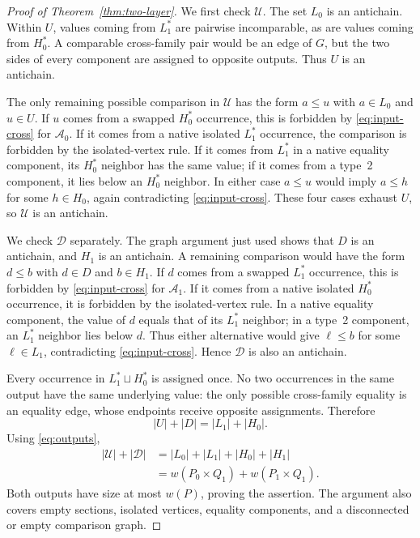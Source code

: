 \documentclass[11pt]{article}
\newcommand{\Q}{Q}
\newcommand{\cA}{\mathcal A}
\newcommand{\cD}{\mathcal D}
\newcommand{\cU}{\mathcal U}
\begin{document}
\begin{proof}[Proof of Theorem~\ref{thm:two-layer}]
We first check $\cU$.  The set $L_0$ is an antichain.  Within $U$, values
coming from $L_1^*$ are pairwise incomparable, as are values coming from
$H_0^*$.  A comparable cross-family pair would be an edge of $G$, but the
two sides of every component are assigned to opposite outputs.  Thus $U$ is
an antichain.

The only remaining possible comparison in $\cU$ has the form $a\leq u$
with $a\in L_0$ and $u\in U$.  If $u$ comes from a swapped $H_0^*$
occurrence, this is forbidden by \eqref{eq:input-cross} for $\cA_0$.  If it
comes from a native isolated $L_1^*$ occurrence, the comparison is forbidden
by the isolated-vertex rule.  If it comes from $L_1^*$ in a native equality
component, its $H_0^*$ neighbor has the same value; if it comes from a
type~2 component, it lies below an $H_0^*$ neighbor.  In either case
$a\leq u$ would imply $a\leq h$ for some $h\in H_0$, again contradicting
\eqref{eq:input-cross}.  These four cases exhaust $U$, so $\cU$ is an
antichain.

We check $\cD$ separately.  The graph argument just used shows that $D$ is
an antichain, and $H_1$ is an antichain.  A remaining comparison would have
the form $d\leq b$ with $d\in D$ and $b\in H_1$.  If $d$ comes from a
swapped $L_1^*$ occurrence, this is forbidden by
\eqref{eq:input-cross} for $\cA_1$.  If it comes from a native isolated
$H_0^*$ occurrence, it is forbidden by the isolated-vertex rule.  In a
native equality component, the value of $d$ equals that of its $L_1^*$
neighbor; in a type~2 component, an $L_1^*$ neighbor lies below $d$.
Thus either alternative would give $\ell\leq b$ for some $\ell\in L_1$,
contradicting \eqref{eq:input-cross}.  Hence $\cD$ is also an antichain.

Every occurrence in $L_1^*\sqcup H_0^*$ is assigned once.  No two
occurrences in the same output have the same underlying value: the only
possible cross-family equality is an equality edge, whose endpoints receive
opposite assignments.  Therefore
\[
 |U|+|D|=|L_1|+|H_0|.
\]
Using \eqref{eq:outputs},
\begin{align*}
 |\cU|+|\cD|
 &=|L_0|+|L_1|+|H_0|+|H_1|\\
 &=w(P_0\times\Q_1)+w(P_1\times\Q_1).
\end{align*}
Both outputs have size at most $w(P)$, proving the assertion.  The argument
also covers empty sections, isolated vertices, equality components, and a
disconnected or empty comparison graph.
\end{proof}
\end{document}

